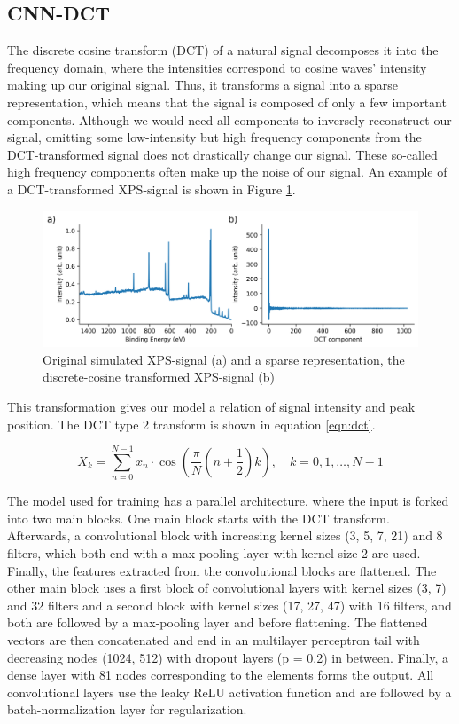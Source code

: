 \subsection{CNN-DCT}
The discrete cosine transform (DCT) of a natural signal decomposes it into the frequency domain, where the intensities correspond to cosine waves' intensity making up our original signal. Thus, it transforms a signal into a sparse representation, which means that the signal is composed of only a few important components. Although we would need all components to inversely reconstruct our signal, omitting some low-intensity but high frequency components from the DCT-transformed signal does not drastically change our signal. These so-called high frequency components often make up the noise of our signal. An example of a DCT-transformed XPS-signal is shown in Figure \ref{fig:dct}.

\begin{figure}[H]
    \centering
    \includegraphics[width=\textwidth]{Figures/dct.png}
    \caption{Original simulated XPS-signal (a) and a sparse representation, the discrete-cosine transformed XPS-signal (b)}
    \label{fig:dct}
\end{figure}

This transformation gives our model a relation of signal intensity and peak position. The DCT type 2 transform is shown in equation \ref{eqn:dct}.

\begin{equation}
\label{eqn:dct}
X_k = \sum_{n=0}^{N-1} x_n \cdot \cos\left(\frac{\pi}{N}\left(n + \frac{1}{2}\right)k\right), \quad k = 0, 1, \ldots, N-1
\end{equation}

The model used for training has a parallel architecture, where the input is forked into two main blocks. One main block starts with the DCT transform. Afterwards, a convolutional block with increasing kernel sizes (3, 5, 7, 21) and 8 filters, which both end with a max-pooling layer with kernel size 2 are used. Finally, the features extracted from the convolutional blocks are flattened.
The other main block uses a first block of convolutional layers with kernel sizes (3, 7) and 32 filters and a second block with kernel sizes (17, 27, 47) with 16 filters, and both are followed by a max-pooling layer and before flattening. The flattened vectors are then concatenated and end in an multilayer perceptron tail with decreasing nodes (1024, 512) with dropout layers (p = 0.2) in between. Finally, a dense layer with 81 nodes corresponding to the elements forms the output. All convolutional layers use the leaky ReLU activation function and are followed by a batch-normalization layer for regularization.



